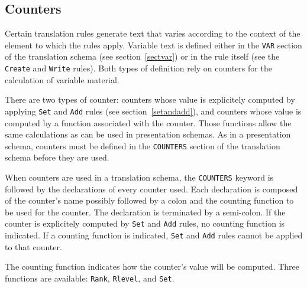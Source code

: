 \subsection{Counters}
\label{counters}

Certain translation rules generate text that varies according to the
context of the element to which the rules apply.  Variable text is
defined either in the {\tt VAR} section of the translation schema (see
section~\ref{sectvar}) or in the rule itself (see the {\tt Create} and
{\tt Write} rules).  Both types of definition rely on counters for the
calculation of variable material.

There are two types of counter: counters whose value is explicitely
computed by applying {\tt Set} and {\tt Add} rules (see
section~\ref{setandadd}), and counters whose value is computed by a
function associated with the counter.  Those functions allow the same
calculations as can be used in presentation schemas.
As in a presentation schema, counters must
be defined in the {\tt COUNTERS} section of the translation schema
before they are used.

When counters are used in a translation schema, the {\tt COUNTERS}
keyword is followed by the declarations of every counter used.  Each
declaration is composed of the counter's name possibly followed by a
colon and the counting function to be used for the counter.  The
declaration is terminated by a semi-colon. If the counter is explicitely
computed by {\tt Set} and {\tt Add} rules, no counting function is
indicated. If a counting function is indicated, {\tt Set} and {\tt Add}
rules cannot be applied to that counter.

The counting function indicates how the counter's value will be
computed.  Three functions are available: {\tt Rank}, {\tt Rlevel},
and {\tt Set}.

